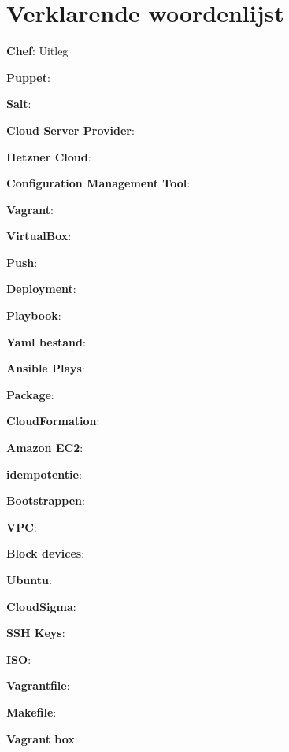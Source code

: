 \chapter{Verklarende woordenlijst}
\textbf{Chef}: Uitleg

\textbf{Puppet}:

\textbf{Salt}:

\textbf{Cloud Server Provider}:

\textbf{Hetzner Cloud}:

\textbf{Configuration Management Tool}:

\textbf{Vagrant}:

\textbf{VirtualBox}:

\textbf{Push}:

\textbf{Deployment}:

\textbf{Playbook}:

\textbf{Yaml bestand}:

\textbf{Ansible Plays}:

\textbf{Package}:

\textbf{CloudFormation}:

\textbf{Amazon EC2}:

\textbf{idempotentie}:

\textbf{Bootstrappen}:

\textbf{VPC}:

\textbf{Block devices}:

\textbf{Ubuntu}:

\textbf{CloudSigma}:

\textbf{SSH Keys}:

\textbf{ISO}:

\textbf{Vagrantfile}:

\textbf{Makefile}:

\textbf{Vagrant box}: